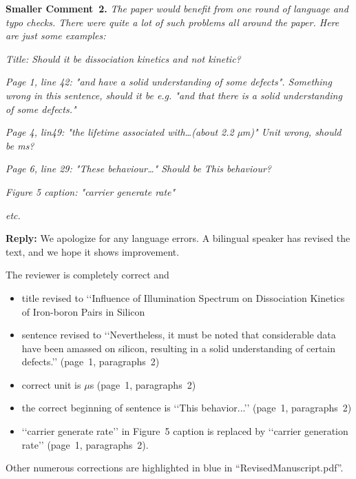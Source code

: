 \documentclass{WileyMSP-template}
\begin{document}
\vspace{1cm}
\noindent
\textcolor[rgb]{0.00,0.50,1.00}{\textbf{Smaller Comment~2.}}
\emph{The paper would benefit from one round of language and typo checks.
There were quite a lot of such problems all around the paper.
Here are just some examples:}

\emph{Title: Should it be dissociation kinetics and not kinetic?}

\emph{Page 1, line 42:
"and have a solid understanding of some defects".
Something wrong in this sentence,
should it be e.g. "and that there is a solid understanding of some defects."}

\emph{
Page 4, lin49: "the lifetime associated with…(about 2.2 µm)" Unit wrong, should be ms?}

\emph{
Page 6, line 29: "These behaviour…" Should be This behaviour?}

\emph{
Figure 5 caption: "carrier generate rate"}

\emph{
etc.}

\noindent
\textcolor[rgb]{0.51,0.00,0.00}{\textbf{Reply:}}
We apologize for any language errors.
A bilingual speaker has revised the text, and we hope it shows improvement.

The reviewer is completely correct and
\begin{itemize}
  \item title revised to ‘‘Influence of Illumination Spectrum on Dissociation Kinetics of Iron-boron Pairs in Silicon
  \item sentence revised to ‘‘Nevertheless, it must be noted that considerable data have been amassed on silicon, resulting in a solid understanding of certain defects.’’
  (page~1, paragraphs~2)
  \item correct unit is $\mu$s (page~1, paragraphs~2)
  \item the correct beginning of sentence is ‘‘This behavior...’’ (page~1, paragraphs~2)
  \item ‘‘carrier generate rate’’ in Figure~5 caption is replaced by ‘‘carrier generation rate’’ (page~1, paragraphs~2).
\end{itemize}

Other numerous corrections are highlighted in blue in ``RevisedManuscript.pdf''.
\end{document}
